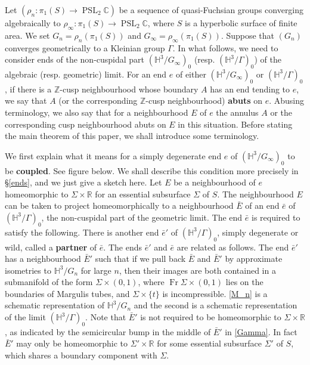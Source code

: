 \documentclass{amsart}
\theoremstyle{definition}
\newcommand{\reals}{\mathbb{R}}
\newcommand{\complexes}{\mathbb{C}}
\newcommand{\Fr}{\operatorname{Fr}}
\newcommand{\integers}{\mathbb{Z}}
\newcommand{\pslc}{\operatorname{PSL}_2\complexes}
\newcommand\HHH{{\mathbb H}}
\begin{document}
 Let $(\rho_n: \pi_1(S) \rightarrow \pslc)$ be a sequence of quasi-Fuchsian groups  converging algebraically to $\rho_\infty: \pi_1(S) \rightarrow \pslc$, where $S$ is a hyperbolic surface of finite area.
 We set $G_n=\rho_n(\pi_1(S))$ and $G_\infty=\rho_\infty(\pi_1(S))$.
 Suppose that $(G_n)$ converges geometrically to a Kleinian group $\Gamma$.
 In what follows, we need to consider ends of the non-cuspidal part $(\HHH^3/G_\infty)_0$ (resp. $(\HHH^3/\Gamma)_0$) of the algebraic (resp. geometric) limit.
For an end $e$ of either $(\HHH^3/G_\infty)_0$ or $(\HHH^3/\Gamma)_0$, if  there is a $\integers$-cusp neighbourhood whose boundary $A$ has an end tending to $e$, we say that $A$ (or the corresponding $\integers$-cusp neighbourhood) {\bf abuts} on $e$.
Abusing terminology, we also say that for a neighbourhood $E$ of $e$  the annulus $A$ or the corresponding cusp neighbourhood abuts on $E$  in this situation. Before stating the main theorem of this paper, we shall introduce some terminology.

We first explain what it means for a simply degenerate end $e$ of $(\HHH^3/G_\infty)_0$ to be {\bf coupled}. See figure below.
We shall describe this condition more precisely in \S \ref{ends}, and we just give a sketch here. Let $E$ be a neighbourhood of $e$ homeomorphic to $\Sigma \times \reals$ for an essential subsurface $\Sigma$ of $S$. The neighbourhood $E$ can be taken to project homeomorphically to a neighbourhood $\bar E$ of an end $\bar e$ of $(\HHH^3/\Gamma)_0$, the non-cuspidal part of the geometric limit.  The end $\bar e$ is required to satisfy the following.
There is another end $\bar e'$ of $(\HHH^3/\Gamma)_0$,  simply degenerate or wild,  called a {\bf partner} of $\bar e$. The ends $\bar e'$ and $\bar e$ are related  as follows. The end $\bar e'$ has a neighbourhood $\bar E'$ such that 
if we pull back   $\bar E$ and $\bar E'$ by approximate isometries to $\HHH^3/G_n$ for large $n$, then their images are both contained in a submanifold of the form $\Sigma \times (0,1)$, where $\Fr \Sigma \times (0,1)$ lies on the boundaries of Margulis tubes, and $\Sigma \times \{t\}$ is  incompressible. \cref{M_n} is a schematic representation of $\HHH^3/G_n$ and the second is a schematic representation of the limit $(\HHH^3/\Gamma)_0$.
Note that   $\bar E'$  is not required to be homeomorphic to $\Sigma \times \reals$, as indicated by the semicircular bump in the middle of $\bar E'$ in \cref{Gamma}.
In fact   $\bar E'$  may only be homeomorphic to $\Sigma' \times \reals$ for some essential subsurface $\Sigma'$  of $S$, which shares a boundary component with $\Sigma$. 
\end{document}
